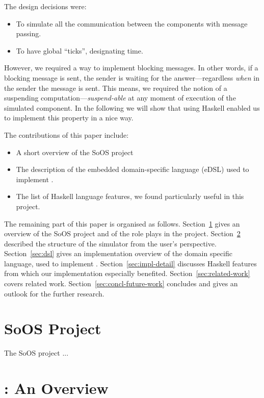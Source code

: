 The design decisions were:
\begin{itemize}
\item To simulate all the communication between the components with message passing.
\item To have global ``ticks'', designating time.
\end{itemize}
However, we required a way to implement blocking messages.
In other words, if a blocking message is sent, the sender is waiting for the answer---regardless \emph{when} in the sender the message is sent.
This means, we required the notion of a suspending computation---\emph{suspend-able} at any moment of execution of the simulated component.
In the following we will show that using Haskell \cite{haskell-report} enabled us to implement this property in a nice way.

The contributions of this paper include:
\begin{itemize}
\item A short overview of the SoOS project
\item The description of the embedded domain-specific language (eDSL) used to implement \soosim.
\item The list of Haskell language features, we found particularly useful in this project.
\end{itemize}

The remaining part of this paper is organised as follows.
Section~\ref{sec:soos-project} gives an overview of the SoOS project and of the role \soosim plays in the project.
Section~\ref{sec:soosim-an-overview} described the structure of the \soosim simulator from the user's perspective.
Section~\ref{sec:dsl} gives an implementation overview of the domain specific language, used to implement \soosim.
Section~\ref{sec:impl-detail} discusses Haskell features from which our implementation especially benefited.
Section~\ref{sec:related-work} covers related work.
Section~\ref{sec:concl-future-work} concludes and gives an outlook for the further research.

\section{SoOS Project}
\label{sec:soos-project}

The SoOS project  \cite{soos}...

\section{\soosim: An Overview}
\label{sec:soosim-an-overview}

